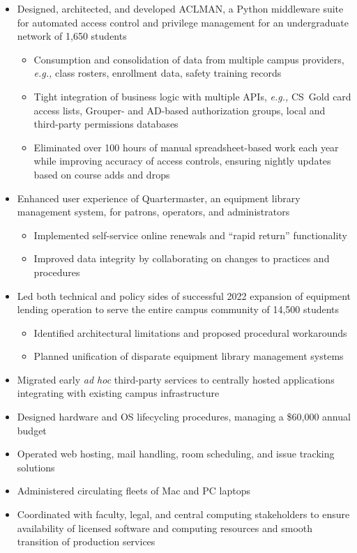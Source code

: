 \documentclass[11pt]{article}
\begin{document}
\begin{itemize}
	\item Designed, architected, and developed ACLMAN,
		a Python middleware suite for automated
		access control and privilege management
		for an undergraduate network of 1,650 students
		\begin{itemize}
			\item Consumption and consolidation of data from multiple campus providers, \emph{e.g.,}
				class rosters, enrollment data,
				safety training records
			\item Tight integration of business logic with multiple APIs, \emph{e.g.,}
				CS~Gold card access lists,
				Grouper- and AD-based authorization groups,
				local and third-party permissions databases
			\item Eliminated over 100 hours of manual spreadsheet-based work each year
				while improving accuracy of access controls,
				ensuring nightly updates based on course adds and drops
		\end{itemize}
	\item Enhanced user experience of Quartermaster,
		an equipment library management system,
		for patrons, operators, and administrators
		\begin{itemize}
			\item Implemented self-service online renewals
				and ``rapid return'' functionality
			\item Improved data integrity by collaborating on
				changes to practices and procedures
		\end{itemize}
	\item Led both technical and policy sides of
		successful 2022 expansion of equipment lending operation
		to serve the entire campus community
		of 14,500 students
		\begin{itemize}
			\item Identified architectural limitations
				and proposed procedural workarounds
			\item Planned unification of disparate
				equipment library management systems
		\end{itemize}
	\item Migrated early \emph{ad hoc} third-party services
		to centrally hosted applications
		integrating with existing campus infrastructure
	\item Designed hardware and OS lifecycling procedures,
		managing a \$60,000 annual budget
	\item Operated web hosting, mail handling,
		room scheduling, and issue tracking solutions
	\item Administered circulating fleets of Mac and PC laptops
	\item Coordinated with faculty, legal, and central computing stakeholders
		to ensure availability of licensed software and computing resources
		and smooth transition of production services
\end{itemize}
\end{document}
